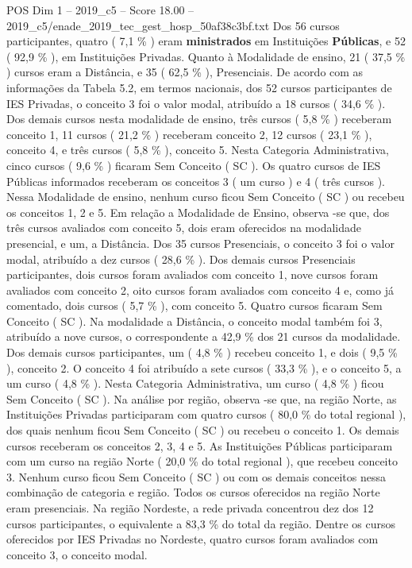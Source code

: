 \begin{textsample}{POS Dim 1 – 2019\_c5 – Score 18.00 – 2019\_c5/enade\_2019\_tec\_gest\_hosp\_50af38c3bf.txt}
Dos 56 cursos participantes, quatro ( 7,1 \% ) eram \textbf{ministrados} em Instituições \textbf{Públicas}, e 52 ( 92,9 \% ), em Instituições Privadas.
Quanto à Modalidade de ensino, 21 ( 37,5 \% ) cursos eram a Distância, e 35 ( 62,5 \% ), Presenciais.
De acordo com as informações da Tabela 5.2, em termos nacionais, dos 52 cursos participantes de IES Privadas, o conceito 3 foi o valor modal, atribuído a 18 cursos ( 34,6 \% ).
Dos demais cursos nesta modalidade de ensino, três cursos ( 5,8 \% ) receberam conceito 1, 11 cursos ( 21,2 \% ) receberam conceito 2, 12 cursos ( 23,1 \% ), conceito 4, e três cursos ( 5,8 \% ), conceito 5.
Nesta Categoria Administrativa, cinco cursos ( 9,6 \% ) ficaram Sem Conceito ( SC ).
Os quatro cursos de IES Públicas informados receberam os conceitos 3 ( um curso ) e 4 ( três cursos ).
Nessa Modalidade de ensino, nenhum curso ficou Sem Conceito ( SC ) ou recebeu os conceitos 1, 2 e 5.
Em relação a Modalidade de Ensino, observa -se que, dos três cursos avaliados com conceito 5, dois eram oferecidos na modalidade presencial, e um, a Distância.
Dos 35 cursos Presenciais, o conceito 3 foi o valor modal, atribuído a dez cursos ( 28,6 \% ).
Dos demais cursos Presenciais participantes, dois cursos foram avaliados com conceito 1, nove cursos foram avaliados com conceito 2, oito cursos foram avaliados com conceito 4 e, como já comentado, dois cursos ( 5,7 \% ), com conceito 5.
Quatro cursos ficaram Sem Conceito ( SC ).
Na modalidade a Distância, o conceito modal também foi 3, atribuído a nove cursos, o correspondente a 42,9 \% dos 21 cursos da modalidade.
Dos demais cursos participantes, um ( 4,8 \% ) recebeu conceito 1, e dois ( 9,5 \% ), conceito 2.
O conceito 4 foi atribuído a sete cursos ( 33,3 \% ), e o conceito 5, a um curso ( 4,8 \% ).
Nesta Categoria Administrativa, um curso ( 4,8 \% ) ficou Sem Conceito ( SC ).
Na análise por região, observa -se que, na região Norte, as Instituições Privadas participaram com quatro cursos ( 80,0 \% do total regional ), dos quais nenhum ficou Sem Conceito ( SC ) ou recebeu o conceito 1.
Os demais cursos receberam os conceitos 2, 3, 4 e 5.
As Instituições Públicas participaram com um curso na região Norte ( 20,0 \% do total regional ), que recebeu conceito 3.
Nenhum curso ficou Sem Conceito ( SC ) ou com os demais conceitos nessa combinação de categoria e região.
Todos os cursos oferecidos na região Norte eram presenciais.
Na região Nordeste, a rede privada concentrou dez dos 12 cursos participantes, o equivalente a 83,3 \% do total da região.
Dentre os cursos oferecidos por IES Privadas no Nordeste, quatro cursos foram avaliados com conceito 3, o conceito modal.

\end{textsample}
